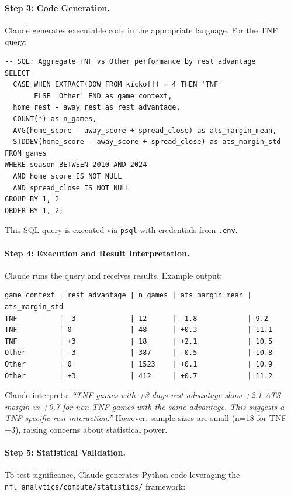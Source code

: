 \paragraph{Step 3: Code Generation.}
Claude generates executable code in the appropriate language. For the TNF query:

\begin{verbatim}
-- SQL: Aggregate TNF vs Other performance by rest advantage
SELECT
  CASE WHEN EXTRACT(DOW FROM kickoff) = 4 THEN 'TNF'
       ELSE 'Other' END as game_context,
  home_rest - away_rest as rest_advantage,
  COUNT(*) as n_games,
  AVG(home_score - away_score + spread_close) as ats_margin_mean,
  STDDEV(home_score - away_score + spread_close) as ats_margin_std
FROM games
WHERE season BETWEEN 2010 AND 2024
  AND home_score IS NOT NULL
  AND spread_close IS NOT NULL
GROUP BY 1, 2
ORDER BY 1, 2;
\end{verbatim}

This SQL query is executed via \texttt{psql} with credentials from \texttt{.env}.

\paragraph{Step 4: Execution and Result Interpretation.}
Claude runs the query and receives results. Example output:
\begin{verbatim}
game_context | rest_advantage | n_games | ats_margin_mean | ats_margin_std
TNF          | -3             | 12      | -1.8            | 9.2
TNF          | 0              | 48      | +0.3            | 11.1
TNF          | +3             | 18      | +2.1            | 10.5
Other        | -3             | 387     | -0.5            | 10.8
Other        | 0              | 1523    | +0.1            | 10.9
Other        | +3             | 412     | +0.7            | 11.2
\end{verbatim}

Claude interprets: \textit{``TNF games with +3 days rest advantage show +2.1 ATS margin vs +0.7 for non‑TNF games with the same advantage. This suggests a TNF‑specific rest interaction.''} However, sample sizes are small (n=18 for TNF +3), raising concerns about statistical power.

\paragraph{Step 5: Statistical Validation.}
To test significance, Claude generates Python code leveraging the \texttt{nfl\_analytics/compute/statistics/} framework:

